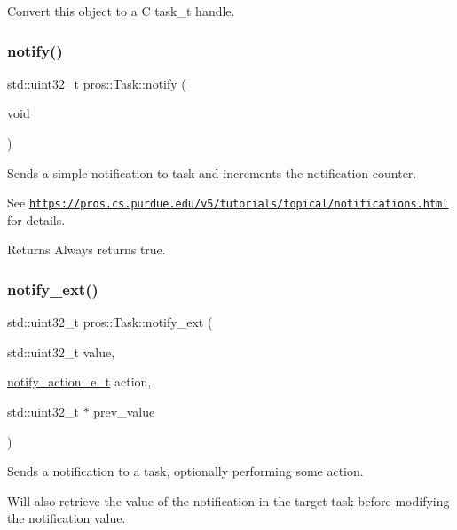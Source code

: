 Convert this object to a C task\+\_\+t handle. 

\mbox{\label{classpros_1_1Task_ad376e3065701ba4853d4be1c90c0544c}} 
\subsubsection{\texorpdfstring{notify()}{notify()}}
{\footnotesize\ttfamily std\+::uint32\+\_\+t pros\+::\+Task\+::notify (\begin{DoxyParamCaption}\item[{void}]{ }\end{DoxyParamCaption})}



Sends a simple notification to task and increments the notification counter. 

See \href{https://pros.cs.purdue.edu/v5/tutorials/topical/notifications.html}{\tt https\+://pros.\+cs.\+purdue.\+edu/v5/tutorials/topical/notifications.\+html} for details.

\begin{DoxyReturn}{Returns}
Always returns true. 
\end{DoxyReturn}
\mbox{\label{classpros_1_1Task_add5bc6272aaa903fdf8ae6656d8ffddb}} 
\subsubsection{\texorpdfstring{notify\+\_\+ext()}{notify\_ext()}}
{\footnotesize\ttfamily std\+::uint32\+\_\+t pros\+::\+Task\+::notify\+\_\+ext (\begin{DoxyParamCaption}\item[{std\+::uint32\+\_\+t}]{value,  }\item[{\hyperlink{rtos_8h_a42ea99b5e5d38da0b98154609cf6c570}{notify\+\_\+action\+\_\+e\+\_\+t}}]{action,  }\item[{std\+::uint32\+\_\+t $\ast$}]{prev\+\_\+value }\end{DoxyParamCaption})}



Sends a notification to a task, optionally performing some action. 

Will also retrieve the value of the notification in the target task before modifying the notification value.

